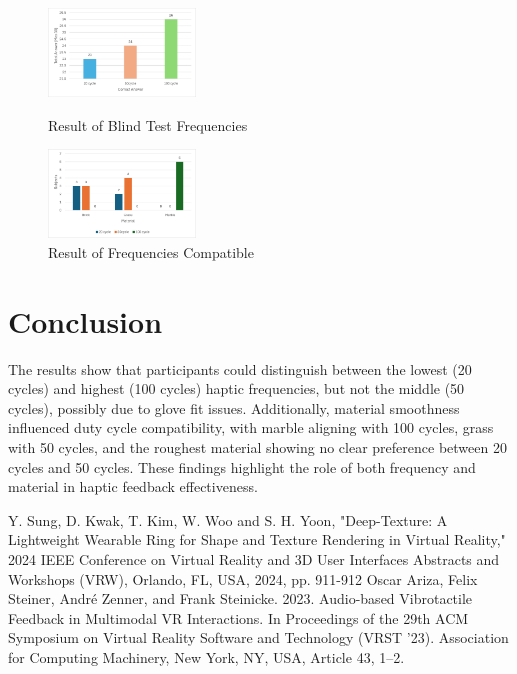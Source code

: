 \documentclass[a4paper,twocolumn]{article}
\begin{document}
\begin{figure}[h]
  \centering
  \includegraphics[width=0.35\textwidth]{./Fig/Blind_Test_graph.png}
  \caption{{Result of Blind Test Frequencies}}
  \label{fig1}
  \vspace{0.1cm}
  \centering
  \includegraphics[width=0.35\textwidth]{./Fig/Select_Cycle_graph.png}
  \caption{{Result of Frequencies Compatible}}
  \label{fig2}
\end{figure}


\section{Conclusion}
The results show that participants could distinguish between the lowest (20 cycles) and highest (100 cycles) haptic frequencies, but not the middle (50 cycles), possibly due to glove fit issues. Additionally, material smoothness influenced duty cycle compatibility, with marble aligning with 100 cycles, grass with 50 cycles, and the roughest material showing no clear preference between 20 cycles and 50 cycles. These findings highlight the role of both frequency and material in haptic feedback effectiveness.
\begin{thebibliography}{99}
\scriptsize
     Y. Sung, D. Kwak, T. Kim, W. Woo and S. H. Yoon, "Deep-Texture: A Lightweight Wearable Ring for Shape and Texture Rendering in Virtual Reality," 2024 IEEE Conference on Virtual Reality and 3D User Interfaces Abstracts and Workshops (VRW), Orlando, FL, USA, 2024, pp. 911-912
     Oscar Ariza, Felix Steiner, André Zenner, and Frank Steinicke. 2023. Audio-based Vibrotactile Feedback in Multimodal VR Interactions. In Proceedings of the 29th ACM Symposium on Virtual Reality Software and Technology (VRST '23). Association for Computing Machinery, New York, NY, USA, Article 43, 1–2.
\end{thebibliography}
\end{document}
